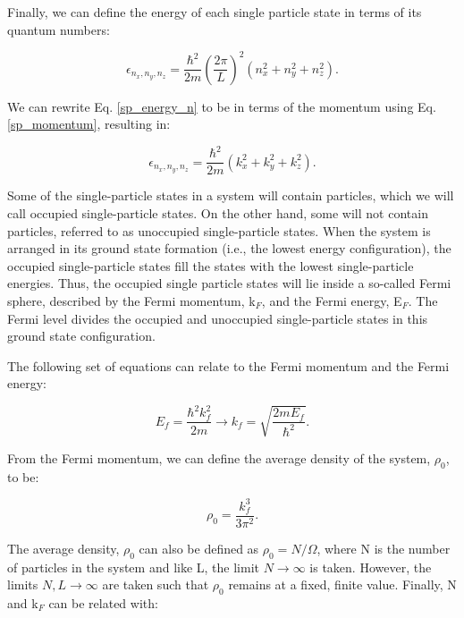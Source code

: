 Finally, we can define the energy of each single particle state in terms of its quantum numbers:

\begin{equation} \label{sp_energy_n}
	\epsilon_{n_x,n_y,n_z} = \frac{\hbar^2}{2m}(\frac{2\pi}{L})^2(n_x^2 + n_y^2 + n_z^2).
\end{equation}

We can rewrite Eq. \ref{sp_energy_n} to be in terms of the momentum using Eq. \ref{sp_momentum}, resulting in:

\begin{equation} \label{sp_energy_k}
	\epsilon_{n_x, n_y, n_z} = \frac{\hbar^2}{2m}(k_x^2 + k_y^2 + k_z^2).
\end{equation}


Some of the single-particle states in a system will contain particles, which we will call occupied single-particle states. On the other hand, some will not contain particles, referred to as unoccupied single-particle states. When the system is arranged in its ground state formation (i.e., the lowest energy configuration), the occupied single-particle states fill the states with the lowest single-particle energies. Thus, the occupied single particle states will lie inside a so-called Fermi sphere, described by the Fermi momentum, k$_F$, and the Fermi energy, E$_F$. The Fermi level divides the occupied and unoccupied single-particle states in this ground state configuration.

The following set of equations can relate to the Fermi momentum and the Fermi energy:


\begin{equation} \label{fermi_energy}
	E_f = \frac{\hbar^2k_f^2}{2m} \longrightarrow k_f = \sqrt{\frac{2mE_f}{\hbar^2}}.
\end{equation}

 From the Fermi momentum, we can define the average density of the system, $\rho_0$, to be:

\begin{equation} \label{density_fermi_momentum}
	\rho_0 = \frac{k_f^3}{3\pi^2}.
\end{equation}

The average density, $\rho_0$ can also be defined as $\rho_0 = N/\Omega$, where N is the number of particles in the system and like L, the limit $N \rightarrow \infty$ is taken. However, the limits $N, L \rightarrow \infty$ are taken such that $\rho_0$ remains at a fixed, finite value. Finally, N and k$_F$ can be related with:

